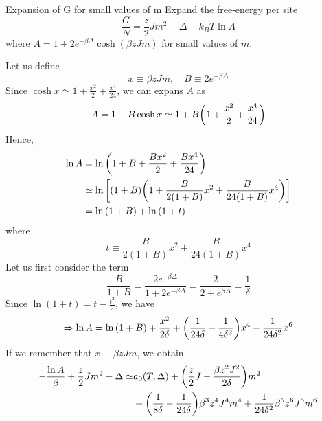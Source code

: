 \documentclass[../main/main.tex]{subfiles}
\begin{document}
\begin{exercise}{Expansion of G for small values of m }{}
Expand the free-energy per site
\begin{equation*}
  \frac{G}{N} = \frac{z}{2} J m^2 - \Delta - k_B T \ln{A}
\end{equation*}
where \( A = 1 + 2 e^{-\beta \Delta } \cosh(\beta z J m) \) for small values of \( m \). 
\begin{solution}
Let us define
\begin{equation*}
  x \equiv \beta z J m, \quad B \equiv 2 e^{-\beta \Delta }
\end{equation*}
Since \( \cosh x \simeq 1 + \frac{x^2}{2} + \frac{x^4}{24} \), we can expans \(A\) as
\begin{equation*}
  A = 1 + B \cosh x \simeq 1 + B \qty(1 + \frac{x^2}{2} + \frac{x^4}{24})
\end{equation*}
Hence,
\begin{equation*}
\begin{split}
  \ln{A} &= \ln{\qty(1 + B + \frac{B x^2}{2} + \frac{B x^4}{24}) } \\
  &\simeq
  \ln{\qty[(1+B)\qty(1+ \frac{B}{2(1+B)}x^2 + \frac{B}{24(1+B)}x^4) ] } \\
  & = \ln{(1+B)} + \ln{(1+t)}
\end{split}
\end{equation*}
where
\begin{equation*}
  t \equiv \frac{B}{2(1+B)}x^2 + \frac{B}{24(1+B)}x^4
\end{equation*}
Let us first consider the term
\begin{equation*}
  \frac{B}{1+B} = \frac{2 e^{-\beta \Delta } }{1 + 2 e^{-\beta \Delta } } = \frac{2}{2+ e^{\beta \Delta } } = \frac{1}{\delta}
\end{equation*}
Since \(\ln{(1+t)} = t - \frac{t^2}{2} \), we have
\begin{equation*}
  \Rightarrow \ln{A} = \ln{(1+B)} + \frac{x^2}{2 \delta } + \qty(\frac{1}{24 \delta } - \frac{1}{4 \delta ^2})x^4 - \frac{1}{24 \delta ^2}x^6
\end{equation*}
If we remember that \( x \equiv \beta z J m\), we obtain
\begin{equation*}
\begin{split}
  - \frac{\ln{A} }{\beta} + \frac{z}{2} J m^2 - \Delta \simeq & a_0 (T,\Delta )
  + \qty(\frac{z}{2}J - \frac{\beta z^2 J^2}{2 \delta })m^2 \\
  &+ \qty(\frac{1}{8 \delta }- \frac{1}{24 \delta })\beta ^3 z^4 J^4 m^4
  + \frac{1}{24 \delta ^2} \beta ^5 z^6 J^6 m^6

\end{split}
\end{equation*}
\end{solution}
\end{exercise}
\end{document}
